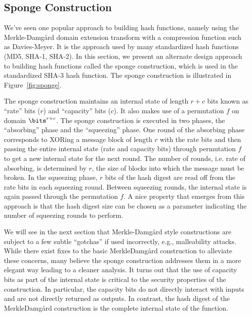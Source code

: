 \subsection{Sponge Construction}
We've seen one popular approach to building hash functions, namely using the Merkle-Damg\aa rd domain extension transform with a compression function such as Davies-Meyer.
It is the approach used by many standardized hash functions (MD5, SHA-1, SHA-2).
In this section, we present an alternate design approach to building hash functions called the sponge construction, which is used in the standardized SHA-3 hash function.
The sponge construction is illustrated in Figure~\ref{fig:sponge}.

The sponge construction maintains an internal state of length $r+c$ bits known as ``rate'' bits ($r$) and ``capacity'' bits ($c$).
It also makes use of a permutation $f$ on domain $\bits^{r+c}$.
The sponge construction is executed in two phases, the ``absorbing'' phase and the ``squeezing'' phase.
One round of the absorbing phase corresponds to XORing a message block of length $r$ with the rate bits and then passing the entire internal state (rate and capacity bits) through permutation $f$ to get a new internal state for the next round.
The number of rounds, i.e. rate of absorbing, is determined by $r$, the size of blocks into which the message must be broken.
In the squeezing phase, $r$ bits of the hash digest are read off from the rate bits in each squeezing round.
Between squeezing rounds, the internal state is again passed through the permutation $f$.
A nice property that emerges from this approach is that the hash digest size can be chosen as a parameter indicating the number of squeezing rounds to perform.

We will see in the next section that Merkle-Damg\aa rd style constructions are subject to a few subtle ``gotchas'' if used incorrectly, e.g., malleability attacks.
While there exist fixes to the basic Merkle\dash Damg\aa rd construction to alleviate these concerns, many believe the sponge construction addresses them in a more elegant way leading to a cleaner analysis.
It turns out that the use of capacity bits as part of the internal state is critical to the security properties of the construction.
In particular, the capacity bits do not directly interact with inputs and are not directly returned as outputs.
In contrast, the hash digest of the Merkle\dash Damg\aa rd construction is the complete internal state of the function.


